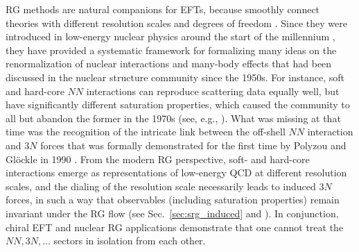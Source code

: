 {RG methods are natural companions for
EFTs, because smoothly connect theories with different resolution scales 
and degrees of freedom \cite{Lepage:1989hf,Lepage:1997py}. Since they 
were introduced in low-energy nuclear physics around the start 
of the millennium \cite{Bogner:2003os,Bogner:2007od,Bogner:2010pq,Furnstahl:2013zt}, 
they have provided a systematic framework for formalizing many ideas on the 
renormalization of nuclear interactions and many-body effects that had been 
discussed in the nuclear structure community since the 1950s. For instance,
soft and hard-core $NN$ interactions can reproduce scattering data equally
well, but have significantly different saturation properties, which caused
the community to all but abandon the former in the 1970s (see, e.g., \cite{Bethe:1971qf}). 
What was missing at that time was the recognition 
of the intricate link between the off-shell $NN$ interaction and $3N$ forces 
that was formally demonstrated for the first time by Polyzou and Gl\"ockle in 1990 \cite{Polyzou:1990fk}.
From the modern RG perspective, soft- and hard-core interactions emerge
as representations of low-energy QCD at different resolution scales, 
and the dialing of the resolution scale necessarily leads to induced
$3N$ forces, in such a way that observables (including saturation
properties) remain invariant under the RG flow (see Sec.~\ref{sec:srg_induced} 
and \cite{Bogner:2010pq,Furnstahl:2013zt}). In conjunction, chiral EFT
and nuclear RG applications demonstrate that one cannot treat the $NN, 3N, \ldots$
sectors in isolation from each other.

}
